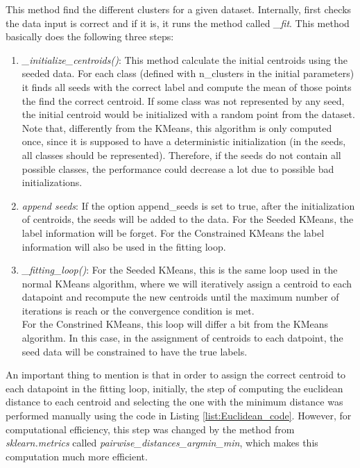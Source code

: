\documentclass[11pt]{article}
\begin{document}
This method find the different clusters for a given dataset. Internally, first checks the data input is correct and if it is, it runs the method called \textit{\_fit}. This method basically does the following three steps:
\begin{enumerate}
	\item \textit{\_initialize\_centroids()}: This method calculate the initial centroids using the seeded data. For each class (defined with n\_clusters in the initial parameters) it finds all seeds with the correct label and compute the mean of those points the find the correct centroid. If some class was not represented by any seed, the initial centroid would be initialized with a random point from the dataset. Note that, differently from the KMeans, this algorithm is only computed once, since it is supposed to have a deterministic initialization (in the seeds, all classes should be represented). Therefore, if the seeds do not contain all possible classes, the performance could decrease a lot due to possible bad initializations.
	\item \textit{append seeds}: If the option append\_seeds is set to true, after the initialization of centroids, the seeds will be added to the data. For the Seeded KMeans, the label information will be forget. For the Constrained KMeans the label information will also be used in the fitting loop.
	\item \textit{\_fitting\_loop()}: For the Seeded KMeans, this is the same loop used in the normal KMeans algorithm, where we will iteratively assign a centroid to each datapoint and recompute the new centroids until the maximum number of iterations is reach or the convergence condition is met. \\
	For the Constrined KMeans, this loop will differ a bit from the KMeans algorithm. In this case, in the assignment of centroids to each datpoint, the seed data will be constrained to have the true labels. 	
\end{enumerate}

An important thing to mention is that in order to assign the correct centroid to each datapoint in the fitting loop, initially, the step of computing the euclidean distance to each centroid and selecting the one with the minimum distance was performed manually using the code in Listing \ref{list:Euclidean_code}. However, for computational efficiency, this step was changed by the method from \textit{sklearn.metrics} called \textit{pairwise\_distances\_argmin\_min}, which makes this computation much more efficient.
\end{document}
